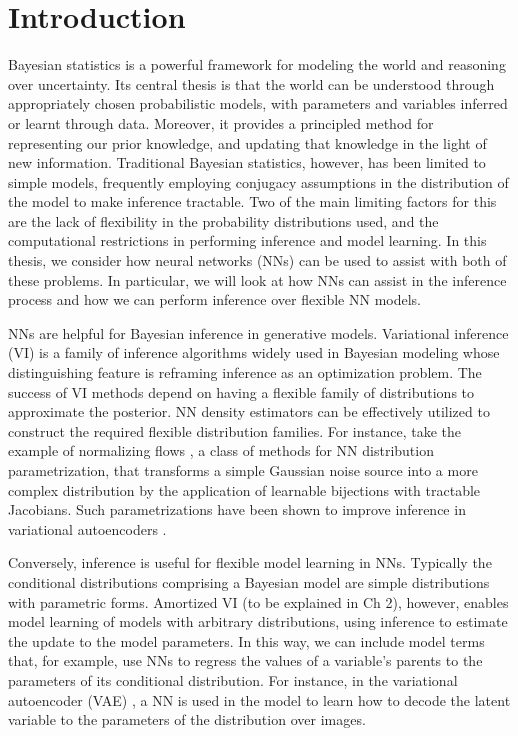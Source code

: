 \chapter{Introduction}
\label{chp:intro}

Bayesian statistics \citep{gelman2013bayesian, Ghahramani2015} is a powerful framework for modeling the world and reasoning over uncertainty. Its central thesis is that the world can be understood through appropriately chosen probabilistic models, with parameters and variables inferred or learnt through data. Moreover, it provides a principled method for representing our prior knowledge, and updating that knowledge in the light of new information. Traditional Bayesian statistics, however, has been limited to simple models, frequently employing conjugacy assumptions in the distribution of the model to make inference tractable. Two of the main limiting factors for this are the lack of flexibility in the probability distributions used, and the computational restrictions in performing inference and model learning. In this thesis, we consider how neural networks (NNs) can be used to assist with both of these problems. In particular, we will look at how NNs can assist in the inference process and how we can perform inference over flexible NN models.

NNs are helpful for Bayesian inference in generative models. Variational inference (VI) is a family of inference algorithms widely used in Bayesian modeling whose distinguishing feature is reframing inference as an optimization problem. The success of VI methods depend on having a flexible family of distributions to approximate the posterior. NN density estimators can be effectively utilized to construct the required flexible distribution families. For instance, take the example of normalizing flows \citep{RezendeMohamed2015}, a class of methods for NN distribution parametrization, that transforms a simple Gaussian noise source into a more complex distribution by the application of learnable bijections with tractable Jacobians. Such parametrizations have been shown to improve inference in variational autoencoders \citep{KingmaEtAl2016}.


Conversely, inference is useful for flexible model learning in NNs. Typically the conditional distributions comprising a Bayesian model are simple distributions with parametric forms. Amortized VI (to be explained in Ch 2), however, enables model learning of models with arbitrary distributions, using inference to estimate the update to the model parameters. In this way, we can include model terms that, for example, use NNs to regress the values of a variable's parents to the parameters of its conditional distribution. For instance, in the variational autoencoder (VAE) \citep{KingmaWelling2013}, a NN is used in the model to learn how to decode the latent variable to the parameters of the distribution over images.

